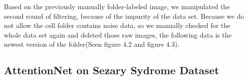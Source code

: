 Based on the previously manually folder-labeled image, we manipulated the second round of filtering, because of the impurity of the data set. Because we do not allow the cell folder contains noise data, so we manually checked for the whole data set again and deleted those raw images, the following data is the newest version of the folder(Seen figure 4.2 and figure 4.3). 



\subsection{AttentionNet on Sezary Sydrome Dataset}

\begin{table}[t]
\end{table}
